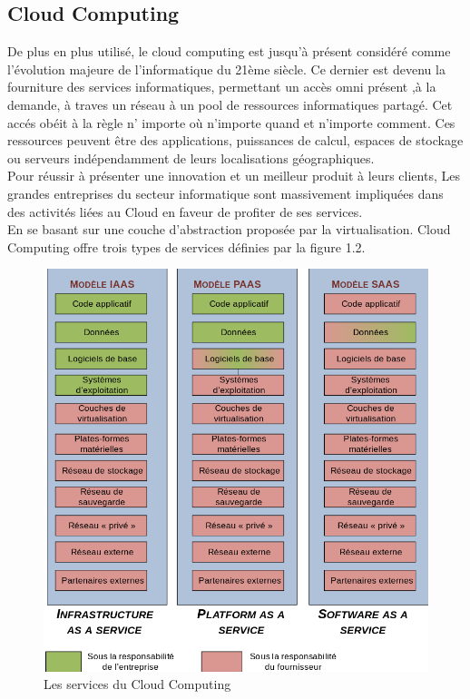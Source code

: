 \subsection{Cloud Computing}
De  plus  en  plus  utilisé,  le  cloud  computing  est  jusqu'à  présent  considéré  comme  l'évolution  majeure  de  l'informatique  du  21ème  siècle.  Ce  dernier  est  devenu  la  fourniture  des 
services  informatiques,  permettant  un  accès  omni présent ,à  la  demande, à traves un réseau   
à  un  pool  de  ressources  informatiques partagé. Cet accés obéit à la règle n' importe où n'importe quand et n'importe comment. 
 Ces ressources peuvent être des applications,  puissances de calcul, espaces de stockage  ou serveurs indépendamment de leurs localisations géographiques.\\
Pour réussir à présenter une innovation et un meilleur produit à leurs clients, Les grandes entreprises du  secteur informatique sont massivement impliquées dans des activités liées au Cloud en faveur de profiter de ses services. \\
En se basant sur une couche d'abstraction  proposée par la virtualisation. Cloud Computing offre trois types de services définies par la figure 1.2. 
\begin{figure}[ht]
	\centering
	\includegraphics[scale=0.7]{servicesCloud.jpg}
	\caption{Les services du Cloud Computing}
	\label{Les services du Cloud Computing}
\end{figure}

